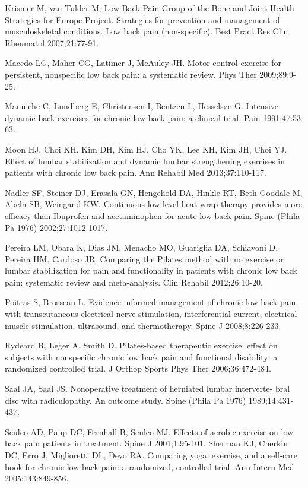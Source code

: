 \documentclass[a5paper]{article}
\theoremstyle{definition}
\begin{document}
Krismer M, van Tulder M; Low Back Pain Group of the Bone and Joint
Health Strategies for Europe Project. Strategies for prevention and
management of musculoskeletal conditions. Low back pain (non-specific). Best Pract Res Clin Rheumatol 2007;21:77-91.

Macedo LG, Maher CG, Latimer J, McAuley JH. Motor control exercise
for persistent, nonspecific low back pain: a systematic review. Phys
Ther 2009;89:9-25.

Manniche C, Lundberg E, Christensen I, Bentzen L, Hesselsøe G. Intensive dynamic back exercises for chronic low back pain: a clinical trial.
Pain 1991;47:53-63.

Moon HJ, Choi KH, Kim DH, Kim HJ, Cho YK, Lee KH, Kim JH, Choi YJ.
Effect of lumbar stabilization and dynamic lumbar strengthening exercises in patients with chronic low back pain. Ann Rehabil Med
2013;37:110-117.

Nadler SF, Steiner DJ, Erasala GN, Hengehold DA, Hinkle RT, Beth
Goodale M, Abeln SB, Weingand KW. Continuous low-level heat
wrap therapy provides more efficacy than Ibuprofen and acetaminophen for acute low back pain. Spine (Phila Pa 1976) 2002;27:1012-1017.

Pereira LM, Obara K, Dias JM, Menacho MO, Guariglia DA, Schiavoni D,
Pereira HM, Cardoso JR. Comparing the Pilates method with no exercise or lumbar stabilization for pain and functionality in patients with
chronic low back pain: systematic review and meta-analysis. Clin Rehabil 2012;26:10-20.

Poitras S, Brosseau L. Evidence-informed management of chronic low
back pain with transcutaneous electrical nerve stimulation, interferential current, electrical muscle stimulation, ultrasound, and thermotherapy. Spine J 2008;8:226-233.

Rydeard R, Leger A, Smith D. Pilates-based therapeutic exercise: effect on
subjects with nonspecific chronic low back pain and functional disability: a randomized controlled trial. J Orthop Sports Phys Ther
2006;36:472-484.

Saal JA, Saal JS. Nonoperative treatment of herniated lumbar interverte-
bral disc with radiculopathy. An outcome study. Spine (Phila Pa 1976)
1989;14:431-437.

Sculco AD, Paup DC, Fernhall B, Sculco MJ. Effects of aerobic exercise on
low back pain patients in treatment. Spine J 2001;1:95-101.
Sherman KJ, Cherkin DC, Erro J, Miglioretti DL, Deyo RA. Comparing
yoga, exercise, and a self-care book for chronic low back pain: a randomized, controlled trial. Ann Intern Med 2005;143:849-856.
\end{document}
